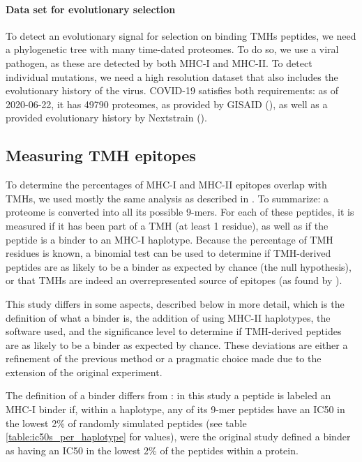 \paragraph{Data set for evolutionary selection}

To detect an evolutionary signal for selection on binding
TMHs peptides, we need a phylogenetic tree with 
many time-dated proteomes.
To do so, we use a viral pathogen, as these are detected by both
MHC-I and MHC-II.
To detect individual mutations, we need a high resolution dataset
that also includes the evolutionary history of the virus.
COVID-19 satisfies both requirements:
as of 2020-06-22, it has 49790 proteomes, as provided by GISAID (\cite{shu2017gisaid}),
as well as a provided evolutionary history by Nextstrain (\cite{hadfield2018nextstrain}).

\subsection{Measuring TMH epitopes}

To determine the percentages of MHC-I and MHC-II epitopes overlap
with TMHs, we used mostly the same analysis as described in \cite{bianchi2017}.
To summarize: a proteome is converted into all its possible 9-mers. For each
of these peptides, it is measured if it has been part of a TMH (at least
1 residue), as well as if the peptide is a binder to an MHC-I haplotype.
Because the percentage of TMH residues is known, a binomial test can be
used to determine if TMH-derived peptides are as likely to be a binder
as expected by chance (the null hypothesis), or that TMHs are indeed an
overrepresented source of epitopes (as found by \cite{bianchi2017}).

This study differs in some aspects, described below in more detail,
which is the definition of what a binder is,
the addition of using MHC-II haplotypes, the software used,
and the significance level to determine if TMH-derived peptides are as 
likely to be a binder as expected by chance.
These deviations are either a refinement of the previous method or
a pragmatic choice made due to the extension of the original experiment.

The definition of a binder differs from \cite{bianchi2017}:
in this study a peptide is labeled an MHC-I binder if, within a haplotype, 
any of its 9-mer peptides have an IC50 in the lowest 2\% of randomly simulated 
peptides (see table \ref{table:ic50s_per_haplotype} for values), were the original study defined
a binder as having an IC50 in the lowest 2\% of the peptides within a protein.

